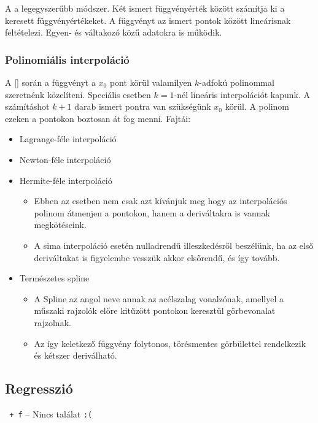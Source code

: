\documentclass[../../main.tex]{subfiles}
\begin{document}
A  a legegyszerűbb módszer. Két ismert függvényérték
között számítja ki a keresett függvényértékeket. A függvényt az ismert pontok
között lineárisnak feltételezi. Egyen- és váltakozó közű adatokra is működik.

\subsubsection{Polinomiális interpoláció}

A [] során a függvényt a $x_0$ pont körül
valamilyen $k$-adfokú polinommal szeretnénk közelíteni. Speciális esetben
$k = 1$-nél lineáris interpolációt kapunk. A számításhot $k + 1$ darab
ismert pontra van szükségünk $x_0$ körül. A polinom ezeken a pontokon
boztosan át fog menni. Fajtái:
\begin{itemize}
  \item Lagrange-féle interpoláció
  \item Newton-féle interpoláció
  \item Hermite-féle interpoláció
        \begin{itemize}
          \item Ebben az esetben nem csak azt kívánjuk meg hogy az interpolációs
                polinom átmenjen a pontokon, hanem a deriváltakra is vannak
                megkötéseink.
          \item A sima interpoláció esetén nulladrendű illeszkedésről beszélünk,
                ha az első deriváltakat is figyelembe vesszük akkor elsőrendű,
                és így tovább.
        \end{itemize}
  \item Természetes spline
        \begin{itemize}
          \item A Spline az angol neve annak az acélszalag vonalzónak, amellyel
                a műszaki rajzolók előre kitűzött pontokon keresztül
                görbevonalat rajzolnak.
          \item Az így keletkező függvény folytonos, törésmentes görbülettel
                rendelkezik és kétszer deriválható.
        \end{itemize}
\end{itemize}

\subsection{Regresszió}

\texttt{\cmdkey{} + f} -- Nincs találat \texttt{:(}
\end{document}
